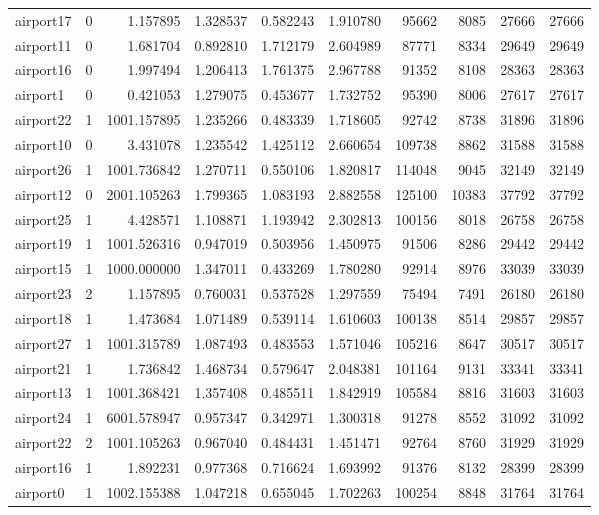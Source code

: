 \begin{longtable}{|l|r|r|r|r|r|r|r|r|r|}
airport17 & 0 & 1.157895 & 1.328537 & 0.582243 & 1.910780 & 95662 & 8085 & 27666 & 27666 \\
airport11 & 0 & 1.681704 & 0.892810 & 1.712179 & 2.604989 & 87771 & 8334 & 29649 & 29649 \\
airport16 & 0 & 1.997494 & 1.206413 & 1.761375 & 2.967788 & 91352 & 8108 & 28363 & 28363 \\
airport1 & 0 & 0.421053 & 1.279075 & 0.453677 & 1.732752 & 95390 & 8006 & 27617 & 27617 \\
airport22 & 1 & 1001.157895 & 1.235266 & 0.483339 & 1.718605 & 92742 & 8738 & 31896 & 31896 \\
airport10 & 0 & 3.431078 & 1.235542 & 1.425112 & 2.660654 & 109738 & 8862 & 31588 & 31588 \\
airport26 & 1 & 1001.736842 & 1.270711 & 0.550106 & 1.820817 & 114048 & 9045 & 32149 & 32149 \\
airport12 & 0 & 2001.105263 & 1.799365 & 1.083193 & 2.882558 & 125100 & 10383 & 37792 & 37792 \\
airport25 & 1 & 4.428571 & 1.108871 & 1.193942 & 2.302813 & 100156 & 8018 & 26758 & 26758 \\
airport19 & 1 & 1001.526316 & 0.947019 & 0.503956 & 1.450975 & 91506 & 8286 & 29442 & 29442 \\
airport15 & 1 & 1000.000000 & 1.347011 & 0.433269 & 1.780280 & 92914 & 8976 & 33039 & 33039 \\
airport23 & 2 & 1.157895 & 0.760031 & 0.537528 & 1.297559 & 75494 & 7491 & 26180 & 26180 \\
airport18 & 1 & 1.473684 & 1.071489 & 0.539114 & 1.610603 & 100138 & 8514 & 29857 & 29857 \\
airport27 & 1 & 1001.315789 & 1.087493 & 0.483553 & 1.571046 & 105216 & 8647 & 30517 & 30517 \\
airport21 & 1 & 1.736842 & 1.468734 & 0.579647 & 2.048381 & 101164 & 9131 & 33341 & 33341 \\
airport13 & 1 & 1001.368421 & 1.357408 & 0.485511 & 1.842919 & 105584 & 8816 & 31603 & 31603 \\
airport24 & 1 & 6001.578947 & 0.957347 & 0.342971 & 1.300318 & 91278 & 8552 & 31092 & 31092 \\
airport22 & 2 & 1001.105263 & 0.967040 & 0.484431 & 1.451471 & 92764 & 8760 & 31929 & 31929 \\
airport16 & 1 & 1.892231 & 0.977368 & 0.716624 & 1.693992 & 91376 & 8132 & 28399 & 28399 \\
airport0 & 1 & 1002.155388 & 1.047218 & 0.655045 & 1.702263 & 100254 & 8848 & 31764 & 31764 \\

\end{longtable}
